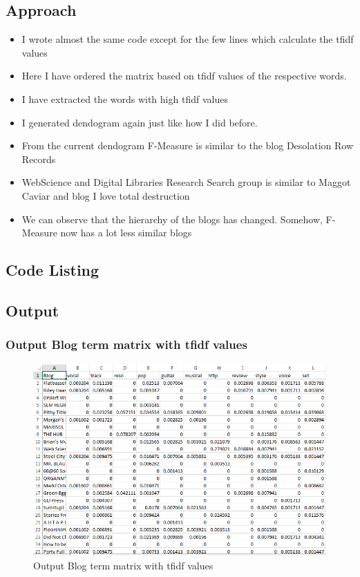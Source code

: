 \documentclass[12pt]{article}
\begin{document}
\subsection{Approach}
\begin{itemize}
\item I wrote almost the same code except for the few lines which calculate the tfidf values
\item Here I have ordered the matrix based on tfidf values of the respective words.
\item I have extracted the words with high tfidf  values 
\item I generated  dendogram again just like how I did before.
\item From the current dendogram F-Measure is similar to the blog Desolation Row Records
\item WebScience and Digital Libraries Research Search group is similar to Maggot Caviar and blog I love total destruction 
\item We can observe that the hierarchy of the blogs has changed. Somehow, F-Measure now has a lot less similar blogs 
\end{itemize}

\subsection{Code Listing}

\newpage
\subsection{Output}
\subsubsection{Output Blog term matrix with tfidf values}
\begin{figure}[ht]
\includegraphics[scale=0.7]{../../q5/output.png}
\centering
\caption{Output Blog term matrix with tfidf values}
\label{Output Blog term matrix with tfidf values}
\end{figure}
\newpage
\end{document}
